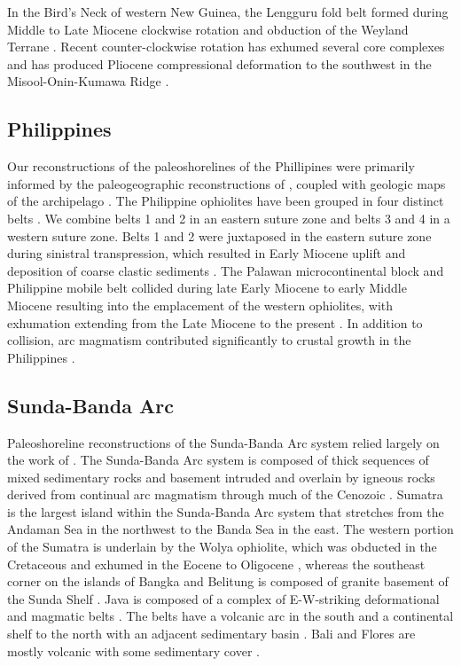 \documentclass[11pt,letterpaper]{article}
\begin{document}
In the Bird’s Neck of western New Guinea, the Lengguru fold belt formed during Middle to Late Miocene clockwise rotation and obduction of the Weyland Terrane \citep{Bailly2009a}. Recent counter-clockwise rotation has exhumed several core complexes and has produced Pliocene compressional deformation to the southwest in the Misool-Onin-Kumawa Ridge \citep{Sapin2009a}.

\subsection*{Philippines}

Our reconstructions of the paleoshorelines of the Phillipines were primarily informed by the paleogeographic reconstructions of \citet{Hall1997a}, coupled with geologic maps of the archipelago \citep{GeologicalSurveyDivision1963a}. The Philippine ophiolites have been grouped in four distinct belts \citep{Yumul2007a}. We combine belts 1 and 2 in an eastern suture zone and belts 3 and 4 in a western suture zone. Belts 1 and 2 were juxtaposed in the eastern suture zone during sinistral transpression, which resulted in Early Miocene uplift and deposition of coarse clastic sediments \citep{Pubellier1991a}. The Palawan microcontinental block and Philippine mobile belt collided during late Early Miocene to early Middle Miocene resulting into the emplacement of the western ophiolites, with exhumation extending from the Late Miocene to the present \citep{Yumul2013a}. In addition to collision, arc magmatism contributed significantly to crustal growth in the Philippines \citep{Dimalanta2006a}.

\subsection*{Sunda-Banda Arc}

Paleoshoreline reconstructions of the Sunda-Banda Arc system relied largely on the work of \citet{Hall2013a}. The Sunda-Banda Arc system is composed of thick sequences of mixed sedimentary rocks and basement intruded and overlain by igneous rocks derived from continual arc magmatism through much of the Cenozoic \citep{Hall2017a}. Sumatra is the largest island within the Sunda-Banda Arc system that stretches from the Andaman Sea in the northwest to the Banda Sea in the east. The western portion of the Sumatra is underlain by the Wolya ophiolite, which was obducted in the Cretaceous and exhumed in the Eocene to Oligocene \citep{Allen2008a}, whereas the southeast corner on the islands of Bangka and Belitung is composed of granite basement of the Sunda Shelf \citep{Hall2009a, Hall2013b}. Java is composed of a complex of E-W-striking deformational and magmatic belts \citep{AudleyCharles2004a}. The belts have a volcanic arc in the south and a continental shelf to the north with an adjacent sedimentary basin \citep{AudleyCharles2004a}. Bali and Flores are mostly volcanic with some sedimentary cover \citep{Hall2009a}.
\end{document}
